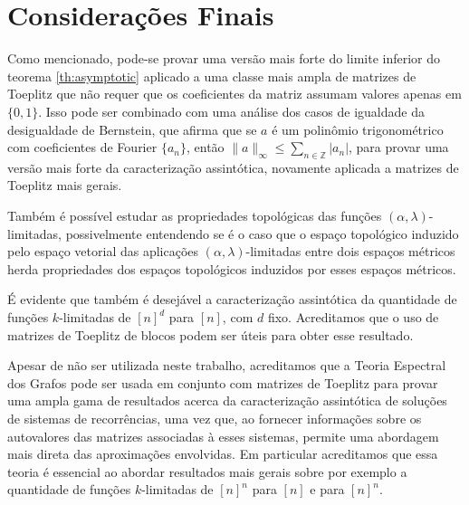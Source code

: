 \section*{Considerações Finais}
\vspace{1cm}

Como mencionado, pode-se provar uma versão mais forte do limite inferior do teorema \ref*{th:asymptotic} aplicado a uma classe mais ampla de matrizes de Toeplitz que não requer que os coeficientes da matriz assumam valores apenas em $\{0, 1\}$. Isso pode ser combinado com uma análise dos casos de igualdade da desigualdade de Bernstein, que afirma que se $a$ é um polinômio trigonométrico com coeficientes de Fourier $\{a_n\}$, então $\|a\|_\infty \le \sum_{n \in \mathbb{Z}} \lvert a_n\rvert$, para provar uma versão mais forte da caracterização assintótica, novamente aplicada a matrizes de Toeplitz mais gerais.

Também é possível estudar as propriedades topológicas das funções $(\alpha, \lambda)$-limitadas, possivelmente entendendo se é o caso que o espaço topológico induzido pelo espaço vetorial das aplicações $(\alpha, \lambda)$-limitadas entre dois espaços métricos herda propriedades dos espaços topológicos induzidos por esses espaços métricos.

É evidente que também é desejável a caracterização assintótica da quantidade de funções $k$-limitadas de $[n]^d$ para $[n]$, com $d$ fixo. Acreditamos que o uso de matrizes de Toeplitz de blocos podem ser úteis para obter esse resultado.

Apesar de não ser utilizada neste trabalho, acreditamos que a Teoria Espectral dos Grafos pode ser usada em conjunto com matrizes de Toeplitz para provar uma ampla gama de resultados acerca da caracterização assintótica de soluções de sistemas de recorrências, uma vez que, ao fornecer informações sobre os autovalores das matrizes associadas à esses sistemas, permite uma abordagem mais direta das aproximações envolvidas. Em particular acreditamos que essa teoria é essencial ao abordar resultados mais gerais sobre por exemplo a quantidade de funções $k$-limitadas de $[n]^n$ para $[n]$ e para $[n]^n$.
